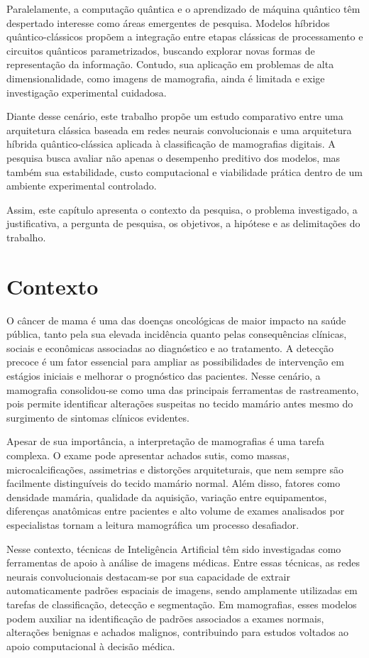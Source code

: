 \documentclass[
    12pt,
    openright,
    oneside,
    a4paper,
    english,
    brazil
]{abntex2}
\begin{document}
Paralelamente, a computação quântica e o aprendizado de máquina quântico têm despertado interesse como áreas emergentes de pesquisa. Modelos híbridos quântico-clássicos propõem a integração entre etapas clássicas de processamento e circuitos quânticos parametrizados, buscando explorar novas formas de representação da informação. Contudo, sua aplicação em problemas de alta dimensionalidade, como imagens de mamografia, ainda é limitada e exige investigação experimental cuidadosa.

Diante desse cenário, este trabalho propõe um estudo comparativo entre uma arquitetura clássica baseada em redes neurais convolucionais e uma arquitetura híbrida quântico-clássica aplicada à classificação de mamografias digitais. A pesquisa busca avaliar não apenas o desempenho preditivo dos modelos, mas também sua estabilidade, custo computacional e viabilidade prática dentro de um ambiente experimental controlado.

Assim, este capítulo apresenta o contexto da pesquisa, o problema investigado, a justificativa, a pergunta de pesquisa, os objetivos, a hipótese e as delimitações do trabalho.

\section{Contexto}

O câncer de mama é uma das doenças oncológicas de maior impacto na saúde pública, tanto pela sua elevada incidência quanto pelas consequências clínicas, sociais e econômicas associadas ao diagnóstico e ao tratamento. A detecção precoce é um fator essencial para ampliar as possibilidades de intervenção em estágios iniciais e melhorar o prognóstico das pacientes. Nesse cenário, a mamografia consolidou-se como uma das principais ferramentas de rastreamento, pois permite identificar alterações suspeitas no tecido mamário antes mesmo do surgimento de sintomas clínicos evidentes.

Apesar de sua importância, a interpretação de mamografias é uma tarefa complexa. O exame pode apresentar achados sutis, como massas, microcalcificações, assimetrias e distorções arquiteturais, que nem sempre são facilmente distinguíveis do tecido mamário normal. Além disso, fatores como densidade mamária, qualidade da aquisição, variação entre equipamentos, diferenças anatômicas entre pacientes e alto volume de exames analisados por especialistas tornam a leitura mamográfica um processo desafiador.

Nesse contexto, técnicas de Inteligência Artificial têm sido investigadas como ferramentas de apoio à análise de imagens médicas. Entre essas técnicas, as redes neurais convolucionais destacam-se por sua capacidade de extrair automaticamente padrões espaciais de imagens, sendo amplamente utilizadas em tarefas de classificação, detecção e segmentação. Em mamografias, esses modelos podem auxiliar na identificação de padrões associados a exames normais, alterações benignas e achados malignos, contribuindo para estudos voltados ao apoio computacional à decisão médica.
\end{document}

